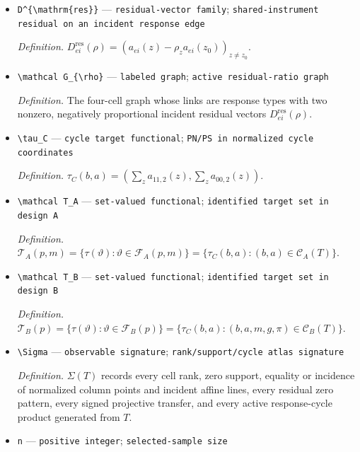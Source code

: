 \documentclass{article}
\begin{document}
\begin{itemize}
  \item \texttt{D\textasciicircum{}\{\textbackslash{}\allowbreak{}mathrm\{res\}\allowbreak{}\}\allowbreak{}} --- \texttt{residual-\allowbreak{}vector family}; \texttt{shared-\allowbreak{}instrument residual on an incident response edge}
  \par\smallskip\noindent\emph{Definition.} \(D^{\mathrm{res}}_{ei}(\rho)=(a_{ei}(z)-\rho_z a_{ei}(z_0))_{z\ne z_0}\).
  \item \texttt{\textbackslash{}\allowbreak{}mathcal G\_\allowbreak{}\{\textbackslash{}\allowbreak{}rho\}\allowbreak{}} --- \texttt{labeled graph}; \texttt{active residual-\allowbreak{}ratio graph}
  \par\smallskip\noindent\emph{Definition.} The four-cell graph whose links are response types with two nonzero, negatively proportional incident residual vectors \(D^{\mathrm{res}}_{ei}(\rho)\).
  \item \texttt{\textbackslash{}\allowbreak{}tau\_\allowbreak{}C} --- \texttt{cycle target functional}; \texttt{PN/\allowbreak{}PS in normalized cycle coordinates}
  \par\smallskip\noindent\emph{Definition.} \(\tau_C(b,a)=(\sum_z a_{11,2}(z),\sum_z a_{00,2}(z))\).
  \item \texttt{\textbackslash{}\allowbreak{}mathcal T\_\allowbreak{}A} --- \texttt{set-\allowbreak{}valued functional}; \texttt{identified target set in design A}
  \par\smallskip\noindent\emph{Definition.} \(\mathcal T_A(p,m)=\{\tau(\vartheta):\vartheta\in\mathcal F_A(p,m)\}=\{\tau_C(b,a):(b,a)\in\mathcal C_A(T)\}\).
  \item \texttt{\textbackslash{}\allowbreak{}mathcal T\_\allowbreak{}B} --- \texttt{set-\allowbreak{}valued functional}; \texttt{identified target set in design B}
  \par\smallskip\noindent\emph{Definition.} \(\mathcal T_B(p)=\{\tau(\vartheta):\vartheta\in\mathcal F_B(p)\}=\{\tau_C(b,a):(b,a,m,g,\pi)\in\mathcal C_B(T)\}\).
  \item \texttt{\textbackslash{}\allowbreak{}Sigma} --- \texttt{observable signature}; \texttt{rank/\allowbreak{}support/\allowbreak{}cycle atlas signature}
  \par\smallskip\noindent\emph{Definition.} \(\Sigma(T)\) records every cell rank, zero support, equality or incidence of normalized column points and incident affine lines, every residual zero pattern, every signed projective transfer, and every active response-cycle product generated from \(T\).
  \item \texttt{n} --- \texttt{positive integer}; \texttt{selected-\allowbreak{}sample size}

\end{itemize}
\end{document}
